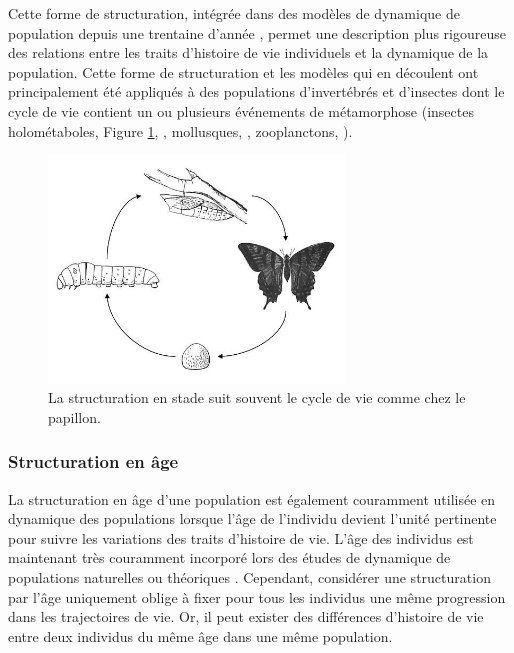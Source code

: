 Cette forme de structuration, intégrée dans des modèles de dynamique de
population depuis une trentaine d'année \autocites{gurney1983a,nisbet1983a},
permet une description plus rigoureuse des relations entre les traits
d'histoire de vie individuels et la dynamique de la population. Cette forme de
structuration et les modèles qui en découlent \autocites{nisbet1989a} ont
principalement été appliqués à des populations d'invertébrés et d'insectes dont le cycle de vie contient un ou
plusieurs événements de métamorphose (insectes holométaboles, Figure
\ref{fig:stade}, \citealp{barclay1980model,gurney1980a,nisbet1983a}, mollusques,
\citealp{taris2006phenotypic}, zooplanctons, \citealp{mccauley1996a}).

\begin{figure}[H]
\centering
\includegraphics[width=0.7\textwidth]{1_CorpsDeThese/EA/Fig/stage}
\caption[structuration en stade]{La
structuration en stade suit souvent le cycle de vie comme chez le papillon.}\label{fig:stade}
\end{figure}

\subsubsection{Structuration en âge}

La structuration en âge d'une population est également couramment utilisée en
dynamique des populations lorsque l'âge de l'individu devient l'unité pertinente
pour suivre les variations des traits d'histoire de vie. L'âge des individus est
maintenant très couramment incorporé lors des études de dynamique de populations
naturelles ou théoriques
\autocite[par ex.
][]{coulson2008a,marteinsdottir2002a,worden2010a,robinson2013a}.
Cependant, considérer une structuration par l'âge uniquement oblige à fixer pour
tous les individus une même progression dans les trajectoires de vie. Or, il
peut exister des différences d'histoire de vie entre deux individus du même âge
dans une même population.

